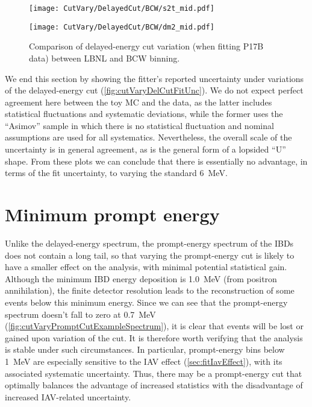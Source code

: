 \documentclass[../thesis.tex]{subfiles}
\begin{document}
\begin{figure}[ht]
  \begin{minipage}{0.5\linewidth}%
    \texttt{[image: CutVary/DelayedCut/BCW/s2t\_mid.pdf]}%
  \end{minipage}%
  \begin{minipage}{0.5\linewidth}%
    \texttt{[image: CutVary/DelayedCut/BCW/dm2\_mid.pdf]}%
  \end{minipage}%
  \caption{Comparison of delayed-energy cut variation (when fitting P17B data) between LBNL and BCW binning.}
  \label{fig:cutVaryDelCutDataResultsBCW}
\end{figure}

We end this section by showing the fitter's reported uncertainty under variations of the delayed-energy cut (\autoref{fig:cutVaryDelCutFitUnc}). We do not expect perfect agreement here between the toy MC and the data, as the latter includes statistical fluctuations and systematic deviations, while the former uses the ``Asimov'' sample in which there is no statistical fluctuation and nominal assumptions are used for all systematics. Nevertheless, the overall scale of the uncertainty is in general agreement, as is the general form of a lopsided ``U'' shape. From these plots we can conclude that there is essentially no advantage, in terms of the fit uncertainty, to varying the standard 6~MeV.

\section{Minimum prompt energy}
\label{sec:cutVaryMinPrompt}

Unlike the delayed-energy spectrum, the prompt-energy spectrum of the IBDs does not contain a long tail, so that varying the prompt-energy cut is likely to have a smaller effect on the analysis, with minimal potential statistical gain. Although the minimum IBD energy deposition is 1.0~MeV (from positron annihilation), the finite detector resolution leads to the reconstruction of some events below this minimum energy. Since we can see that the prompt-energy spectrum doesn't fall to zero at 0.7~MeV (\autoref{fig:cutVaryPromptCutExampleSpectrum}), it is clear that events will be lost or gained upon variation of the cut. It is therefore worth verifying that the analysis is stable under such circumstances. In particular, prompt-energy bins below 1~MeV are especially sensitive to the IAV effect (\autoref{sec:fitIavEffect}), with its associated systematic uncertainty. Thus, there may be a prompt-energy cut that optimally balances the advantage of increased statistics with the disadvantage of increased IAV-related uncertainty.
\end{document}
